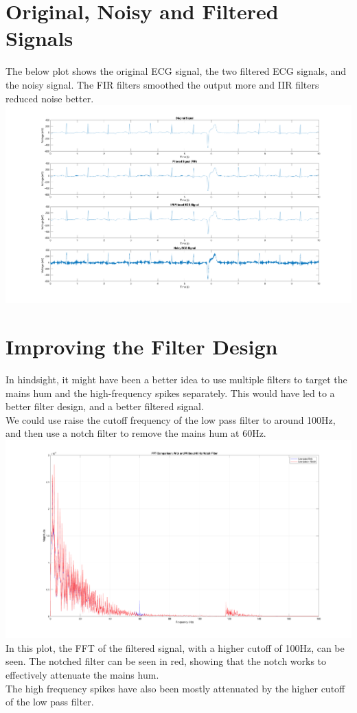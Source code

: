 \documentclass[11pt,oneside]{book}
\begin{document}
\chapter{Original, Noisy and Filtered Signals}
The below plot shows the original ECG signal, the two filtered ECG signals, and the noisy signal. 
The FIR filters smoothed the output more and IIR filters reduced noise better. 
\\[0.1cm]
\includegraphics[width=23cm]{graphics/four_signals.png}

\chapter{Improving the Filter Design}
In hindsight, it might have been a better idea to use multiple filters to target the mains hum and the high-frequency spikes separately. This would have led to a better filter design, and a better filtered signal.
\\We could use raise the cutoff frequency of the low pass filter to around 100Hz, and then use a notch filter to remove the mains hum at 60Hz.\\[0.1cm]
\includegraphics[width=20cm]{graphics/notched_fft.png}\\
In this plot, the FFT of the filtered signal, with a higher cutoff of 100Hz, can be seen. The notched filter can be seen in red, showing that the notch works to effectively attenuate the mains hum.
\\The high frequency spikes have also been mostly attenuated by the higher cutoff of the low pass filter.\\[0.1cm]
\end{document}

